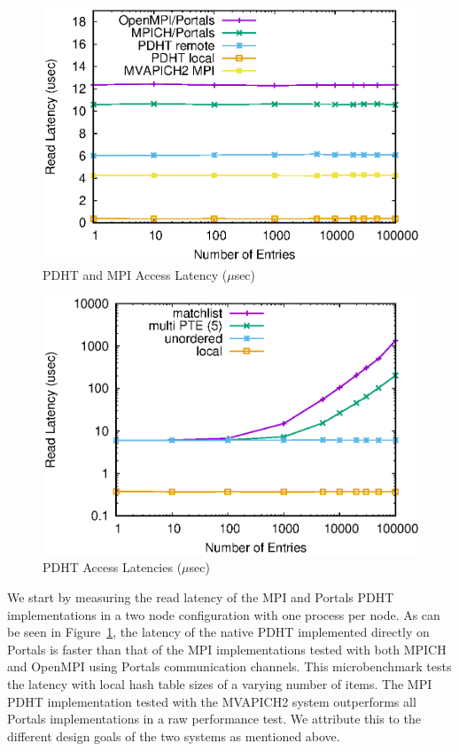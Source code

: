 \begin{figure}
  \centering
  \includegraphics[width=.9\linewidth]{plots/mpilatency}
  \caption{PDHT and MPI Access Latency ($\mu$sec)}
  \label{fig:all-latency}
\end{figure}

\begin{figure}
  \centering
  \includegraphics[width=.9\linewidth]{plots/pdhtlatency}
  \caption{PDHT Access Latencies ($\mu$sec)}
  \label{fig:pdht-latency}
\end{figure}


We start by measuring the read latency of the MPI and Portals PDHT
implementations in a two node configuration with one process per node. As can
be seen in Figure~\ref{fig:all-latency}, the latency of
the native PDHT implemented directly on Portals is faster than that of the MPI
implementations tested with both MPICH and OpenMPI using Portals communication
channels. This microbenchmark tests the latency with local hash table sizes of a varying
number of items. The MPI PDHT implementation tested with the MVAPICH2 system
outperforms all Portals implementations in a raw performance test. We attribute
this to the different design goals of the two systems as mentioned above. 



